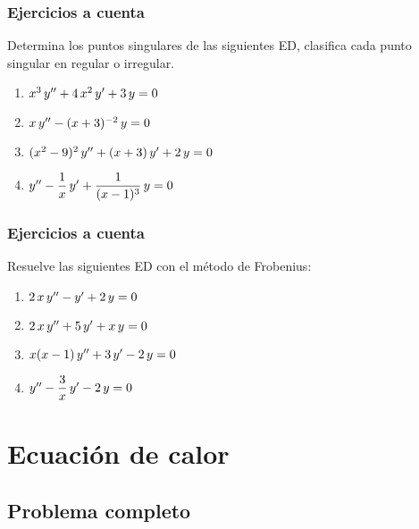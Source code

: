 \documentclass[12pt]{beamer}
\begin{document}
\begin{frame}
\frametitle{Ejercicios a cuenta}
Determina los puntos singulares de las siguientes ED, clasifica cada punto singular en regular o irregular.
\begin{enumerate}
\item $x^{3} \, {y}^{\prime \prime} + 4 \, x^{2} \, {y}^{\prime} + 3 \, y = 0$
\item $x \, {y}^{\prime \prime} - (x + 3)^{-2} \, y = 0$
\item $(x^{2} - 9)^{2} \, {y}^{\prime \prime} + (x + 3) \, {y}^{\prime} + 2 \, y = 0$
\item ${y}^{\prime \prime} - \dfrac{1}{x} \, {y}^{\prime} + \dfrac{1}{(x - 1)^{3}} \, y = 0$
\end{enumerate}
\end{frame}
\begin{frame}
\frametitle{Ejercicios a cuenta}
Resuelve las siguientes ED con el método de Frobenius:
\begin{enumerate} 
\item $2 \, x \, {y}^{\prime \prime} - {y}^{\prime} + 2 \, y = 0$
\item $2 \, x \, {y}^{\prime \prime} + 5 \, {y}^{\prime} + x \, y = 0$
\item $x (x - 1) \, {y}^{\prime \prime} + 3 \, {y}^{\prime} - 2 \, y = 0$
\item ${y}^{\prime \prime} - \dfrac{3}{x} \, {y}^{\prime} - 2 \, y = 0$
\end{enumerate}
\end{frame}

\section{Ecuación de calor}
\subsection{Problema completo}
\end{document}
